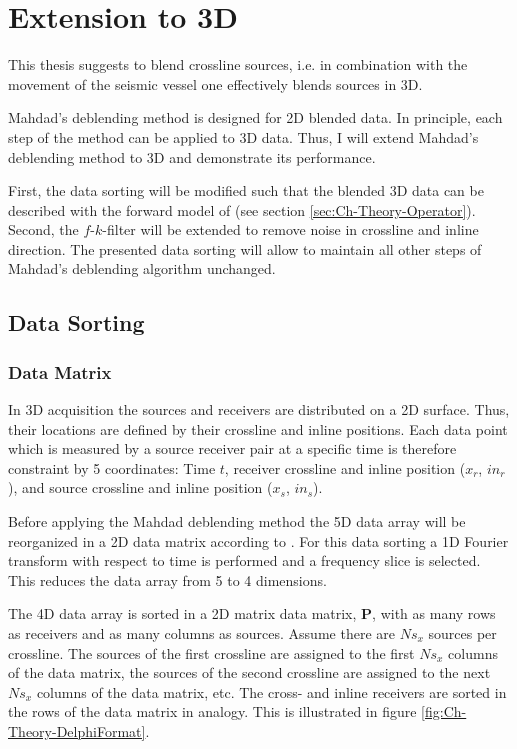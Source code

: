 \FloatBarrier

\section{Extension to 3D} \label{sec:MahdadMethod3d}

This thesis suggests to blend crossline sources, i.e. in combination with the movement of the seismic vessel one effectively blends sources in 3D.

Mahdad's deblending method is designed for 2D blended data. In principle, each step of the method can be applied to 3D data. Thus, I will extend Mahdad's deblending method to 3D and demonstrate its performance.

First, the data sorting will be modified such that the blended 3D data can be described with the forward model of \citet{Berkhout1982} (see section \ref{sec:Ch-Theory-Operator}). Second, the $f$-$k$-filter will be extended to remove noise in crossline and inline direction. The presented data sorting will allow to maintain all other steps of Mahdad's deblending algorithm unchanged.

\subsection{Data Sorting} \label{sec:Ch-Theory-3dExtension-DataSorting}

\subsubsection*{Data Matrix}

In 3D acquisition the sources and receivers are distributed on a 2D surface. Thus, their locations are defined by their crossline and inline positions. Each data point which is measured by a source receiver pair at a specific time is therefore constraint by 5 coordinates: Time $t$, receiver crossline and inline position ($x_r$, $in_r$), and source crossline and inline position ($x_s$, $in_s$).

Before applying the Mahdad deblending method the 5D data array will be reorganized in a 2D data matrix according to \citet{Delphi-Format}. For this data sorting a 1D Fourier transform with respect to time is performed and a frequency slice is selected. This reduces the data array from 5 to 4 dimensions. 

The 4D data array is sorted in a 2D matrix data matrix, $\mathbf{P}$, with as many rows as receivers and as many columns as sources. Assume there are $Ns_x$ sources per crossline. The sources of the first crossline are assigned to the first $Ns_x$ columns of the data matrix, the sources of the second crossline are assigned to the next $Ns_x$ columns of the data matrix, etc. The cross- and inline receivers are sorted in the rows of the data matrix in analogy. This is illustrated in figure \ref{fig:Ch-Theory-DelphiFormat}. 

